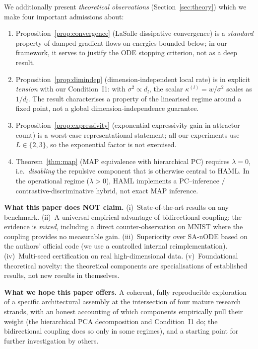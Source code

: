 \documentclass[11pt,a4paper]{article}
\begin{document}
We additionally present \emph{theoretical observations} (Section~\ref{sec:theory})
which we make four important admissions about:
\begin{enumerate}
  \item Proposition~\ref{prop:convergence} (LaSalle dissipative convergence) is a
        \emph{standard} property of damped gradient flows on energies bounded below;
        in our framework, it serves to justify the ODE stopping criterion, not as a
        deep result.
  \item Proposition~\ref{prop:dimindep} (dimension-independent local rate) is in
        explicit \emph{tension} with our Condition~I1: with $\sigma^2 \propto d_l$,
        the scalar $\kappa^{(l)} = w/\sigma^2$ scales as $1/d_l$. The result
        characterises a property of the linearised regime around a fixed point, not a
        global dimension-independence guarantee.
  \item Proposition~\ref{prop:expressivity} (exponential expressivity gain in
        attractor count) is a worst-case representational statement; all our
        experiments use $L \in \{2, 3\}$, so the exponential factor is not exercised.
  \item Theorem~\ref{thm:map} (MAP equivalence with hierarchical PC) requires
        $\lambda = 0$, i.e.\ \emph{disabling} the repulsive component that is
        otherwise central to HAML. In the operational regime ($\lambda > 0$), HAML
        implements a PC--inference / contrastive-discriminative hybrid, not exact
        MAP inference.
\end{enumerate}

\textbf{What this paper does NOT claim.} (i)~State-of-the-art results on any benchmark.
(ii)~A universal empirical advantage of bidirectional coupling: the evidence is
\emph{mixed}, including a direct counter-observation on MNIST where the coupling
provides no measurable gain. (iii)~Superiority over SA-nODE based on the authors'
official code (we use a controlled internal reimplementation). (iv)~Multi-seed
certification on real high-dimensional data. (v)~Foundational theoretical novelty:
the theoretical components are specialisations of established results, not new
results in themselves.

\textbf{What we hope this paper offers.} A coherent, fully reproducible exploration of
a specific architectural assembly at the intersection of four mature research strands,
with an honest accounting of which components empirically pull their weight (the
hierarchical PCA decomposition and Condition~I1 do; the bidirectional coupling does so
only in some regimes), and a starting point for further investigation by others.
\end{document}
